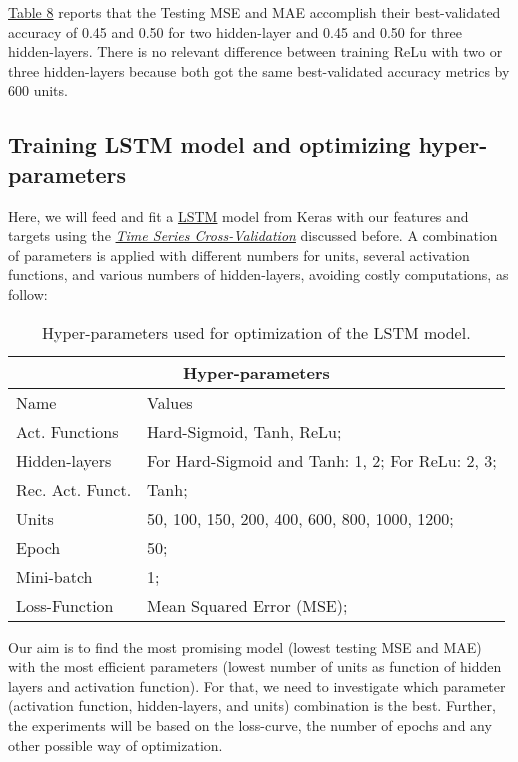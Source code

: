 \hyperref[table:Results for RNN, ReLu, Low]{Table 8} reports that the Testing MSE and MAE accomplish their best-validated accuracy of 0.45 and 0.50 for two hidden-layer and 0.45 and 0.50 for three hidden-layers. There is no relevant difference between training ReLu with two or three hidden-layers because both got the same best-validated accuracy metrics by 600 units.\\

\subsection{Training LSTM model and optimizing hyper-parameters}
\label{chap:Training LSTM model and optimizing hyper-parameters}

\quad Here, we will feed and fit a \href{https://www.tensorflow.org/api_docs/python/tf/keras/layers/LSTMN}{LSTM} model from Keras with our features and targets using the \hyperref[chap:Time series Cross-Validation]{\textit{Time Series Cross-Validation}} discussed before. A combination of parameters is applied with different numbers for units, several activation functions, and various numbers of hidden-layers, avoiding costly computations, as follow:

\begin{table}[H]
\centering
\begin{tabular}{ |p{2.75cm}||p{8cm}|  }
\hline
\multicolumn{2}{|c|}{Hyper-parameters} \\
\hline
Name & Values\\
\hline
Act. Functions & Hard-Sigmoid, Tanh, ReLu;\\
Hidden-layers & For Hard-Sigmoid and Tanh: 1, 2; For ReLu: 2, 3;\\
Rec. Act. Funct. & Tanh;\\
Units & 50, 100, 150, 200, 400, 600, 800, 1000, 1200;\\
Epoch & 50;\\
Mini-batch & 1;\\
Loss-Function & Mean Squared Error (MSE);\\
\hline
\end{tabular}
\label{table:Hyper-parameters for LSTM}
\caption{Hyper-parameters used for optimization of the LSTM model.}
\end{table}

Our aim is to find the most promising model (lowest testing MSE and MAE) with the most efficient parameters (lowest number of units as function of hidden layers and activation function). For that, we need to investigate which parameter (activation function, hidden-layers, and units) combination is the best. Further, the experiments will be based on the loss-curve, the number of epochs and any other possible way of optimization.\\

